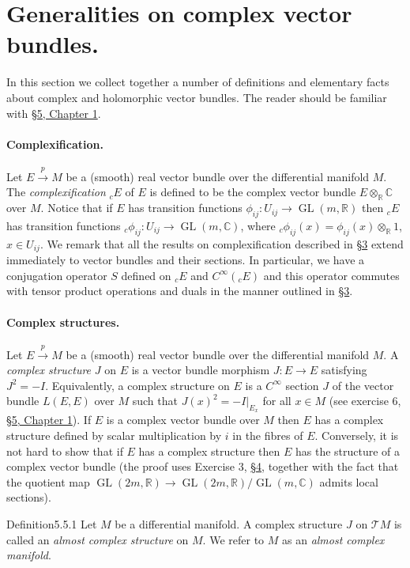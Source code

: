 \section{Generalities on complex vector bundles.}\label{sec:5:5}
In this section we collect together a number of definitions and elementary facts about complex and holomorphic vector bundles. The reader should be familiar with \hyperref[sec:1:5]{\S5, Chapter 1}.
\paragraph{Complexification.} Let $E\xrightarrow{p}M$ be a (smooth) real vector bundle over the differential manifold $M$. The \emph{complexification} ${}_cE$ of $E$ is defined to be the complex vector bundle $E\otimes_{\mathbb R}\mathbb C$ over $M$. Notice that if $E$ has transition functions $\phi_{ij}:U_{ij}\to\operatorname{GL}(m,\mathbb R)$ then ${}_cE$ has transition functions ${}_c\phi_{ij}:U_{ij}\to\operatorname{GL}(m,\mathbb C)$, where ${}_c\phi_{ij}(x)=\phi_{ij}(x)\otimes_{\mathbb R}1$, $x\in U_{ij}$. We remark that all the results on complexification described in \hyperref[sec:5:3]{\S3} extend immediately to vector bundles and their sections. In particular, we have a conjugation operator $S$ defined on ${}_cE$ and $C^\infty({}_cE)$ and this operator commutes with tensor product operations and duals in the manner outlined in \hyperref[sec:5:3]{\S3}.

\paragraph{Complex structures.} Let $E\xrightarrow{p}M$ be a (smooth) real vector bundle over the differential manifold $M$. A \emph{complex structure} $J$ on $E$ is a vector bundle morphism $J:E\to E$ satisfying $J^2=-I$. Equivalently, a complex structure on $E$ is a $C^\infty$ section $J$ of the vector bundle $L(E,E)$ over $M$ such that $J(x)^2=-I|_{E_x}$ for all $x\in M$ (see exercise 6, \hyperref[sec:1:5]{\S5, Chapter 1}). If $E$ is a complex vector bundle over $M$ then $E$ has a complex structure defined by scalar multiplication by $i$ in the fibres of $E$. Conversely, it is not hard to show that if $E$ has a complex structure then $E$ has the structure of a complex vector bundle (the proof uses Exercise 3, \hyperref[sec:5:4]{\S4}, together with the fact that the quotient map $\operatorname{GL}(2m,\mathbb R)\to\operatorname{GL}(2m,\mathbb R)/\operatorname{GL}(m,\mathbb C)$ admits local sections).
\begin{originaltheorem}{Definition}{5.5.1}
Let $M$ be a differential manifold. A complex structure $J$ on $\mathcal TM$ is called an \emph{almost complex structure} on $M$. We refer to $M$ as an \emph{almost complex manifold}.
\end{originaltheorem}
